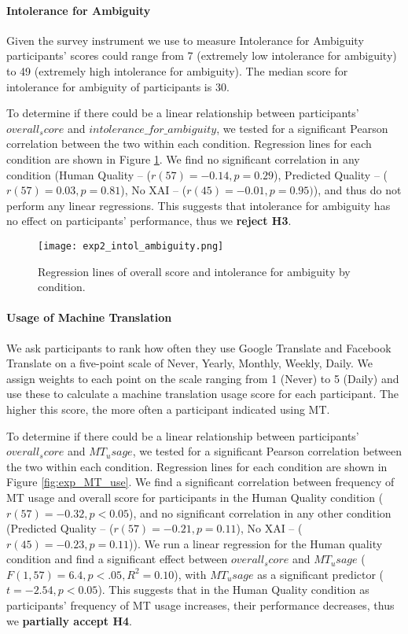 \paragraph{Intolerance for Ambiguity} 

Given the survey instrument we use to measure Intolerance for Ambiguity\cite{gellerTolerance1993} participants’ scores could range from 7 (extremely low intolerance for ambiguity) to 49 (extremely high intolerance for ambiguity). The median score for intolerance for ambiguity of participants is 30. 

To determine if there could be a linear relationship between participants' $overall_score$ and $intolerance\_for\_ambiguity$, we tested for a significant Pearson correlation between the two within each condition. Regression lines for each condition are shown in Figure \ref{fig:exp_intol_ambiguity}. We find no significant correlation in any condition (Human Quality -- ($r(57) = -0.14, p = 0.29$), Predicted Quality --  ($r(57) = 0.03, p = 0.81$), No XAI -- ($r(45) = -0.01, p = 0.95)$), and thus do not perform any linear regressions. This suggests that intolerance for ambiguity has no effect on participants' performance, thus we \textbf{reject H3}. 

\begin{figure}[h!]
    \centering
    \texttt{[image: exp2\_intol\_ambiguity.png]}
    \caption{Regression lines of overall score and intolerance for ambiguity by condition.}
    \label{fig:exp_intol_ambiguity}
\end{figure}

\paragraph{Usage of Machine Translation} 

We ask participants to rank how often they use Google Translate and Facebook Translate on a five-point scale of Never, Yearly, Monthly, Weekly, Daily. We assign weights to each point on the scale ranging from 1 (Never) to 5 (Daily) and use these to calculate a machine translation usage score for each participant. The higher this score, the more often a participant indicated using MT. 

To determine if there could be a linear relationship between participants' $overall_score$ and $MT_usage$, we tested for a significant Pearson correlation between the two within each condition.
Regression lines for each condition are shown in Figure \ref{fig:exp_MT_use}. We find a significant correlation between frequency of MT usage and overall score for participants in the Human Quality condition ($r(57) = -0.32, p < 0.05$), and no significant correlation in any other condition (Predicted Quality -- ($r(57) = -0.21, p = 0.11$), No XAI -- ($r(45) = -0.23, p = 0.11$)). We run a linear regression for the Human quality condition and find a significant effect between $overall_score$ and $MT_usage$ ($F(1, 57) = 6.4, p < .05, R^2 = 0.10$), with $MT_usage$ as a significant predictor ($t = -2.54, p < 0.05$). This suggests that in the Human Quality condition as participants’ frequency of MT usage increases, their performance decreases, thus we \textbf{partially accept H4}.

